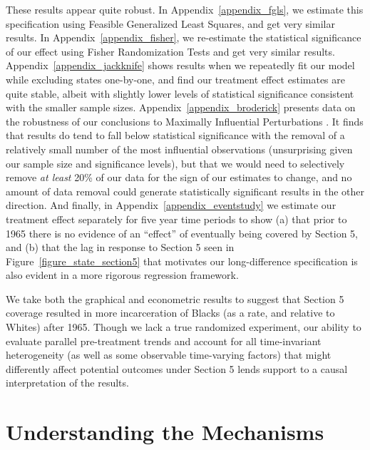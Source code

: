 \documentclass[12pt]{article}
\begin{document}
These results appear quite robust. In Appendix~\ref{appendix_fgls}, we estimate this specification using Feasible Generalized Least Squares, and get very similar results. In Appendix~\ref{appendix_fisher}, we re-estimate the statistical significance of our effect using Fisher Randomization Tests \citep{Fisher:1935uc} and get very similar results. Appendix~\ref{appendix_jackknife} shows results when we repeatedly fit our model while excluding states one-by-one, and find our treatment effect estimates are quite stable, albeit with slightly lower levels of statistical significance consistent with the smaller sample sizes. Appendix~\ref{appendix_broderick} presents data on the robustness of our conclusions to Maximally Influential Perturbations \citep{broderick2021}. It finds that results do tend to fall below statistical significance with the removal of a relatively small number of the most influential observations (unsurprising given our sample size and significance levels), but that we would need to selectively remove \emph{at least} 20\% of our data for the sign of our estimates to change, and no amount of data removal could generate statistically significant results in the other direction. And finally, in Appendix~\ref{appendix_eventstudy} we estimate our treatment effect separately for five year time periods to show (a) that prior to 1965 there is no evidence of an ``effect'' of eventually being covered by Section 5, and (b) that the lag in response to Section 5 seen in Figure~\ref{figure_state_section5} that motivates our long-difference specification is also evident in a more rigorous regression framework.

We take both the graphical and econometric results to suggest that Section 5 coverage resulted in more incarceration of Blacks (as a rate, and relative to Whites) after 1965.  Though we lack a true randomized experiment, our ability to evaluate parallel pre-treatment trends and account for all time-invariant heterogeneity (as well as some observable time-varying factors) that might differently affect potential outcomes under Section 5 lends support to a causal interpretation of the results.



\section{Understanding the Mechanisms}\label{section_selfpolicing}
\end{document}
